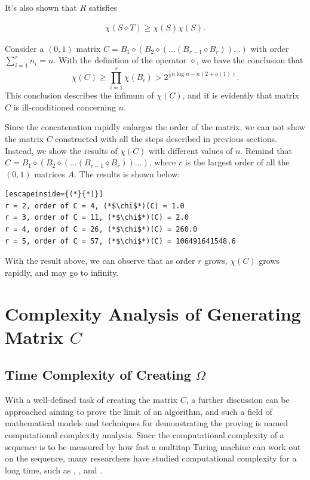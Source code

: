 \documentclass[11pt]{article}
\begin{document}
It's also shown that $R$ satisfies

\begin{align*}
\chi(S \diamond T) \geq \chi(S)\chi(S).
\end{align*}

Consider a $(0, 1)$ matrix $C = B_1 \diamond (B_2 \diamond (. . . (B_{r-1} \diamond B_r))...)$ with order $\sum_{i=1}^rn_i=n$. With the definition of the operator $\diamond$, we have the conclusion that
$$\chi(C)\geq \prod_{i=1}^r\chi(B_i) > 2^{\frac{1}{2}n\log n-n(2+o(1))}.$$
This conclusion describes the infimum of $\chi(C)$, and it is evidently that matrix $C$ is ill-conditioned concerning $n$.

Since the concatenation rapidly enlarges the order of the matrix, we can not show the matrix $C$ constructed with all the steps described in previous sections. Instead, we show the results of $\chi(C)$ with different values of $n$. Remind that $C = B_1 \diamond (B_2 \diamond (. . . (B_{r-1} \diamond B_r))...)$, where $r$ is the largest order of all the $(0, 1)$ matrices $A$. The results is shown below:

\begin{lstlisting}[escapeinside={(*}{*)}]
r = 2, order of C = 4, (*$\chi$*)(C) = 1.0
r = 3, order of C = 11, (*$\chi$*)(C) = 2.0
r = 4, order of C = 26, (*$\chi$*)(C) = 260.0
r = 5, order of C = 57, (*$\chi$*)(C) = 106491641548.6
\end{lstlisting}

With the result above, we can observe that as order $r$ grows, $\chi(C)$ grows rapidly, and may go to infinity.

\section{Complexity Analysis of Generating Matrix $C$}
\subsection{Time Complexity of Creating $\Omega$}
With a well-defined task of creating the matrix $C$, a further discussion can be approached aiming to prove the limit of an algorithm, and such a field of mathematical models and techniques for demonstrating the proving is named computational complexity analysis. Since the computational complexity of a sequence is to be measured by how fast a multitap Turing machine can work out on the sequence\cite{hartmanis1965computational}, many researchers have studied computational complexity for a long time, such as \cite{10.5555/1074100.1074233}, \cite{papadimitriou2003computational}, \cite{du2011theory} and \cite{cook2007overview}.
\end{document}
